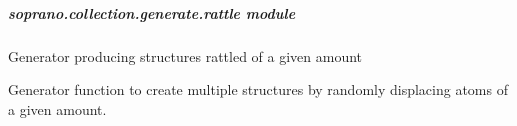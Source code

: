 \documentclass[letterpaper,10pt,english]{sphinxmanual}
\begin{document}
\subparagraph{soprano.collection.generate.rattle module}
\label{doctree/soprano.collection.generate.rattle::doc}\label{doctree/soprano.collection.generate.rattle:soprano-collection-generate-rattle-module}\label{doctree/soprano.collection.generate.rattle:module-soprano.collection.generate.rattle}
Generator producing structures rattled of a given amount

\begin{fulllineitems}
\label{doctree/soprano.collection.generate.rattle:soprano.collection.generate.rattle.rattleGen}
Generator function to create multiple structures by randomly displacing
atoms of a given amount.


\end{fulllineitems}
\end{document}
